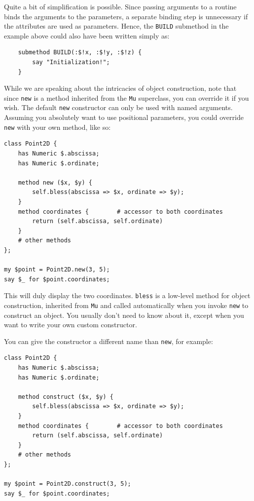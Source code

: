 Quite a bit of simplification is possible. Since passing arguments 
to a routine binds the arguments to the parameters, a separate 
binding step is unnecessary if the attributes are used as 
parameters. Hence, the {\tt BUILD} submethod in the example 
above could also have been written simply as:

\begin{verbatim}
    submethod BUILD(:$!x, :$!y, :$!z) {
        say "Initialization!";
    }
\end{verbatim}


While we are speaking about the intricacies of object 
construction, note that since {\tt new} is a method inherited 
from the {\tt Mu} superclass, you can override it if you wish. 
The default {\tt new} constructor can only be used with named 
arguments. Assuming you absolutely want to use positional parameters, you 
could override {\tt new} with your own method, like so:
 

\begin{verbatim}
class Point2D {
    has Numeric $.abscissa;
    has Numeric $.ordinate;

    method new ($x, $y) {
        self.bless(abscissa => $x, ordinate => $y);
    }
    method coordinates {        # accessor to both coordinates
        return (self.abscissa, self.ordinate)
    }
    # other methods
};

my $point = Point2D.new(3, 5);
say $_ for $point.coordinates;
\end{verbatim}

This will duly display the two coordinates. {\tt bless} is a 
low-level method for object construction, inherited from 
{\tt Mu} and called automatically when you invoke 
{\tt new} to construct an object. You usually don't need 
to know about it, except when you want to write your own custom 
constructor.

You can give the constructor a different name than {\tt new}, 
for example:

\begin{verbatim}
class Point2D {
    has Numeric $.abscissa;
    has Numeric $.ordinate;

    method construct ($x, $y) {
        self.bless(abscissa => $x, ordinate => $y);
    }
    method coordinates {        # accessor to both coordinates
        return (self.abscissa, self.ordinate)
    }
    # other methods
};

my $point = Point2D.construct(3, 5);
say $_ for $point.coordinates;
\end{verbatim}

